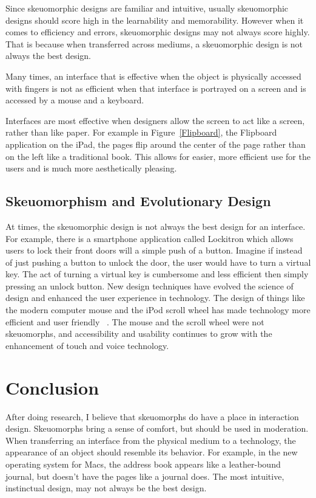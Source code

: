 \documentclass{article}
\begin{document}
	Since skeuomorphic designs are familiar and intuitive, usually skeuomorphic designs should score high in the learnability and memorability. However when it comes to efficiency and errors, skeuomorphic designs may not always score highly. That is because when transferred across mediums, a skeuomorphic design is not always the best design. 
	\begin{emph}Many times, an interface that is effective when the object is physically accessed with fingers is not as efficient when that interface is portrayed on a screen and is accessed by a mouse and a keyboard. 
	\end{emph}
	
	Interfaces are most effective when designers allow the screen to act like a screen, rather than like paper. For example in Figure~\ref{Flipboard}, the Flipboard application on the iPad, the pages flip around the center of the page rather than on the left like a traditional book. This allows for easier, more efficient use for the users and is much more aesthetically pleasing.~\cite{wired}

\subsection{Skeuomorphism and Evolutionary Design}

At times, the skeuomorphic design is not always the best design for an interface. For example, there is a smartphone application called Lockitron which allows users to lock their front doors will a simple push of a button. Imagine if instead of just pushing a button to unlock the door, the user would have to turn a virtual key. The act of turning a virtual key is cumbersome and less efficient then simply pressing an unlock button. New design techniques have evolved the science of design and enhanced the user experience in technology. The design of things like the modern computer mouse and the iPod scroll wheel has made technology more efficient and user friendly ~\cite{ipod}. The mouse and the scroll wheel were not skeuomorphs, and accessibility and usability continues to grow with the enhancement of touch and voice technology. 



\section{Conclusion}

	After doing research, I believe that skeuomorphs do have a place in interaction design. Skeuomorphs bring a sense of comfort, but should be used in moderation. When transferring an interface from the physical medium to a technology, the appearance of an object should resemble its behavior. For example, in the new operating system for Macs, the address book appears like a leather-bound journal, but doesn’t have the pages like a journal does. The most intuitive, instinctual design, may not always be the best design.
\pagebreak


\end{document}
